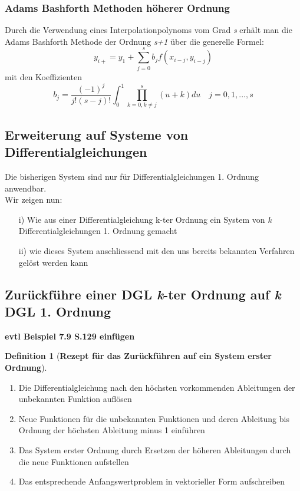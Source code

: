 \documentclass{article}
\theoremstyle{satz}
\theoremstyle{definition}
\newtheorem{definition}{Definition}
\begin{document}
\subsubsection{Adams Bashforth Methoden höherer Ordnung}
Durch die Verwendung eines Interpolationpolynoms vom Grad \textit{s} erhält man die Adams Bashforth Methode der Ordnung \textit{s+1} über die generelle Formel:
\begin{equation}
	y_{i+} = y_1 + \sum_{j=0}^{s} b_j f(x_{i-j}, y_{i-j})
\end{equation}
mit den Koeffizienten
\begin{equation}
	b_j = \frac{(-1)^j}{j!(s-j)!}\int_0^1 \prod_{k=0, k\neq j}^s (u+k)du \quad j=0,1,...,s
\end{equation}

\subsection{Erweiterung auf Systeme von Differentialgleichungen}
Die bisherigen System sind nur für Differentialgleichungen 1. Ordnung anwendbar. \\
Wir zeigen nun:
\begin{itemize}
	\item[i)] Wie aus einer Differentialgleichung k-ter Ordnung ein System von \textit{k} Differentialgleichungen 1. Ordnung gemacht
	\item[ii)] wie dieses System anschliessend mit den uns bereits bekannten Verfahren gelöst werden kann
\end{itemize}

\subsection{Zurückführe einer DGL \textit{k}-ter Ordnung auf \textit{k} DGL 1. Ordnung}
\textbf{evtl Beispiel 7.9 S.129 einfügen}\\

\begin{tcolorbox}
\begin{definition}[\textbf{Rezept für das Zurückführen auf ein System erster Ordnung}]
\begin{enumerate}
	\item Die Differentialgleichung nach den höchsten vorkommenden Ableitungen der unbekannten Funktion auflösen
	\item Neue Funktionen für die unbekannten Funktionen und deren Ableitung bis Ordnung der höchsten Ableitung minus 1 einführen
	\item Das System erster Ordnung durch Ersetzen der höheren Ableitungen durch die neue Funktionen aufstellen
	\item Das entsprechende Anfangswertproblem in vektorieller Form aufschreiben
\end{enumerate}
\end{definition}
\end{tcolorbox}
\end{document}
